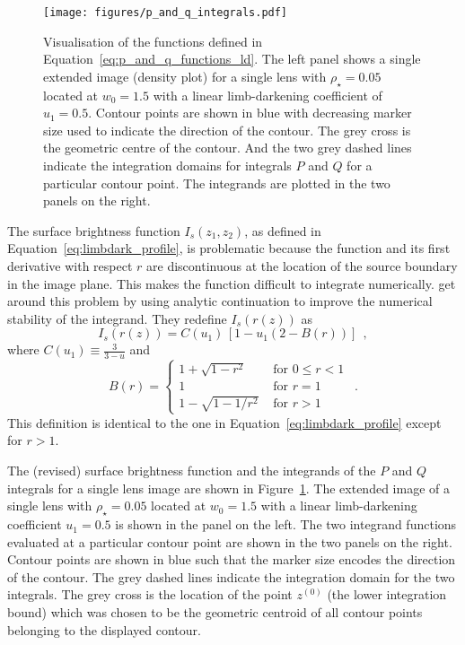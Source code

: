 \documentclass[12pt,dvipsnames]{report}
\newcommand{\hquad}{~~}
\begin{document}
\begin{figure}[t]
    \begin{centering}
        \texttt{[image: figures/p\_and\_q\_integrals.pdf]}
        \caption{Visualisation of the functions defined in Equation~\ref{eq:p_and_q_functions_ld}.
        The left panel shows a single extended image (density plot) for a single lens with $\rho_\star=0.05$ 
        located at $w_0=1.5$ with a linear limb-darkening coefficient of $u_1=0.5$. Contour points
        are shown in blue with decreasing marker size used to indicate the direction of the 
        contour. The grey cross is the geometric centre of the contour. And the two grey 
        dashed lines indicate the integration domains for integrals $P$ and $Q$ for a particular
        contour point. The integrands are plotted in the two panels on the right.}
    \label{fig:p_and_q_integrals}
    \end{centering}
\end{figure}

The surface brightness function $I_s(z_1,z_2)$, as defined in Equation~\ref{eq:limbdark_profile},
is problematic because the function and its first derivative with respect $r$ are
discontinuous at the location of the source boundary in the image plane. 
This makes the function difficult to integrate numerically.
\citet{1998A&A...333L..79D,2007MNRAS.377.1679D} get around this problem by using analytic 
continuation to improve the numerical stability of the integrand. They redefine 
$I_s(r(z))$ as
\begin{equation}
    I_s(r(z))=C(u_1)\,\left[1-u_1\left(2-B(r)\right)\right]
    \hquad,
\end{equation}
where $C(u_1)\equiv\frac{3}{3-u}$  and
\begin{equation}
B(r)= 
\begin{cases}
    1+\sqrt{1-r^{2}} & \text { for } 0 \leq r<1 \\
     1 & \text { for } r=1 \\
      1-\sqrt{1-1 / r^{2}} & \text { for } r>1
    \end{cases}
    \label{eq:limbdark_profile_cont}
    \hquad .
\end{equation}
This definition is identical to the one in Equation~\ref{eq:limbdark_profile} 
except for $r>1$. 

The (revised) surface brightness function and the integrands of the $P$ and $Q$ integrals
for a single lens image are shown in Figure~\ref{fig:p_and_q_integrals}. The extended image
of a single lens with $\rho_\star=0.05$ located at $w_0=1.5$ with a 
linear limb-darkening coefficient $u_1=0.5$  is shown in the panel on the left.
The two integrand functions evaluated at a particular contour point  are shown
in the two panels on the right. Contour points are shown in blue such that the marker size 
encodes the direction of the contour. The grey dashed lines indicate the integration domain for the 
two integrals. The grey cross is the location of the point $z^{(0)}$ (the lower integration
bound) which was chosen to be the geometric centroid of all contour points belonging to the 
displayed contour. 
\end{document}
